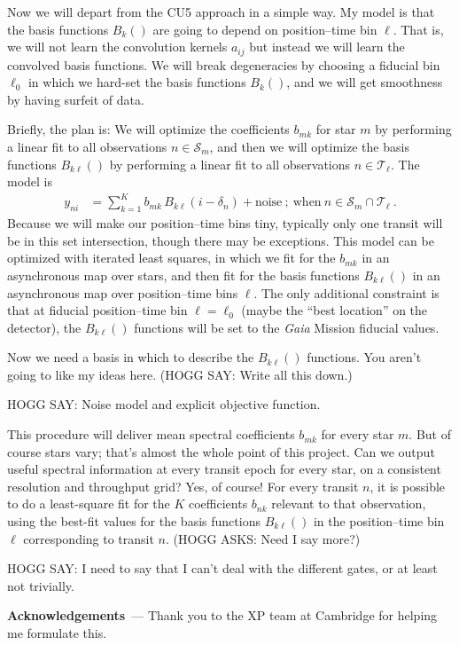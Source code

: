 \documentclass{article}
\renewcommand{\paragraph}[1]{\bigskip\par\noindent\textbf{#1}~---}
\newcommand{\set}[1]{\mathscr{#1}}
\begin{document}
Now we will depart from the CU5 approach in a simple way.
My model is that the basis functions $B_k()$ are going to depend on position--time bin $\ell$.
That is, we will not learn the convolution kernels $a_{ij}$ but instead we will learn the convolved basis functions.
We will break degeneracies by choosing a fiducial bin $\ell_0$ in which we hard-set the basis functions $B_k()$, and we will get smoothness by having surfeit of data.

Briefly, the plan is: We will optimize the coefficients $b_{mk}$ for star $m$ by performing a linear fit to all observations $n\in\set{S}_m$, and then we will optimize the basis functions $B_{k\ell}()$ by performing a linear fit to all observations $n\in\set{T}_\ell$.
The model is
\begin{align}
    y_{ni} &= \sum_{k=1}^K b_{mk}\,B_{k\ell}(i-\delta_n)+\text{noise} ~;~ \text{when} ~ n\in\set{S}_m\cap\set{T}_\ell ~.
\end{align}
Because we will make our position--time bins tiny, typically only one transit will be in this set intersection, though there may be exceptions.
This model can be optimized with iterated least squares, in which we fit for the $b_{mk}$ in an asynchronous map over stars, and then fit for the basis functions $B_{k\ell}()$ in an asynchronous map over position--time bins $\ell$.
The only additional constraint is that at fiducial position--time bin $\ell=\ell_0$ (maybe the ``best location'' on the detector), the $B_{k\ell}()$ functions will be set to the \textsl{Gaia} Mission fiducial values.

Now we need a basis in which to describe the $B_{k\ell}()$ functions.
You aren't going to like my ideas here.
(HOGG SAY: Write all this down.)

HOGG SAY: Noise model and explicit objective function.

This procedure will deliver mean spectral coefficients $b_{mk}$ for every star $m$.
But of course stars vary; that's almost the whole point of this project.
Can we output useful spectral information at every transit epoch for every star, on a consistent resolution and throughput grid?
Yes, of course!
For every transit $n$, it is possible to do a least-square fit for the $K$ coefficients $b_{nk}$ relevant to that observation, using the best-fit values for the basis functions $B_{k\ell}()$ in the position--time bin $\ell$ corresponding to transit $n$.
(HOGG ASKS: Need I say more?)

HOGG SAY: I need to say that I can't deal with the different gates, or at least not trivially.

\paragraph{Acknowledgements}
Thank you to the XP team at Cambridge for helping me formulate this.
\end{document}
